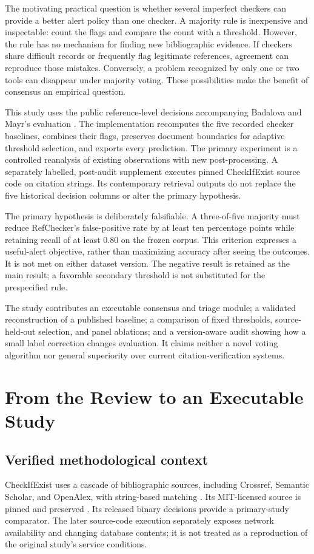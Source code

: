 \documentclass[acmsmall,screen,nonacm]{acmart}
\begin{document}
The motivating practical question is whether several imperfect checkers can provide a better alert policy than one checker. A majority rule is inexpensive and inspectable: count the flags and compare the count with a threshold. However, the rule has no mechanism for finding new bibliographic evidence. If checkers share difficult records or frequently flag legitimate references, agreement can reproduce those mistakes. Conversely, a problem recognized by only one or two tools can disappear under majority voting. These possibilities make the benefit of consensus an empirical question.

This study uses the public reference-level decisions accompanying Badalova and Mayr's evaluation \citep{badalova2026,datasetv1,datasetv11}. The implementation recomputes the five recorded checker baselines, combines their flags, preserves document boundaries for adaptive threshold selection, and exports every prediction. The primary experiment is a controlled reanalysis of existing observations with new post-processing. A separately labelled, post-audit supplement executes pinned CheckIfExist source code on citation strings. Its contemporary retrieval outputs do not replace the five historical decision columns or alter the primary hypothesis.

The primary hypothesis is deliberately falsifiable. A three-of-five majority must reduce RefChecker's false-positive rate by at least ten percentage points while retaining recall of at least 0.80 on the frozen corpus. This criterion expresses a useful-alert objective, rather than maximizing accuracy after seeing the outcomes. It is not met on either dataset version. The negative result is retained as the main result; a favorable secondary threshold is not substituted for the prespecified rule.

The study contributes an executable consensus and triage module; a validated reconstruction of a published baseline; a comparison of fixed thresholds, source-held-out selection, and panel ablations; and a version-aware audit showing how a small label correction changes evaluation. It claims neither a novel voting algorithm nor general superiority over current citation-verification systems.

\section{From the Review to an Executable Study}
\subsection{Verified methodological context}
CheckIfExist uses a cascade of bibliographic sources, including Crossref, Semantic Scholar, and OpenAlex, with string-based matching \citep{abbonato2026}. Its MIT-licensed source is pinned and preserved \citep{checkifexistcode}. Its released binary decisions provide a primary-study comparator. The later source-code execution separately exposes network availability and changing database contents; it is not treated as a reproduction of the original study's service conditions.
\end{document}
